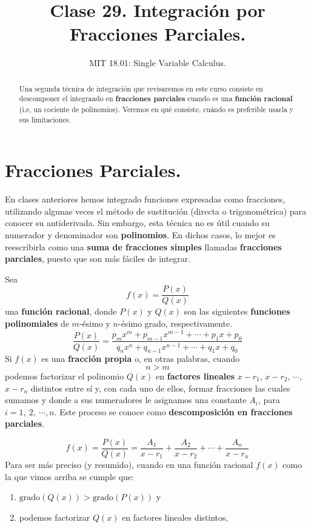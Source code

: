 \documentclass[12pt]{article}
\title{Clase 29. Integración por Fracciones Parciales.}
\author{MIT 18.01: Single Variable Calculus.}
\date{}
\begin{document}
\maketitle

\begin{abstract}
\noindent Una segunda técnica de integración que revisaremos en este curso consiste en descomponer el integrando en \textbf{fracciones parciales} cuando es una \textbf{función racional} (i.e, un cociente de polinomios). Veremos en qué consiste, cuándo es preferible usarla y sus limitaciones.
\end{abstract}


\section{Fracciones Parciales.}

En clases anteriores hemos integrado funciones expresadas como fracciones, utilizando algunas veces el método de sustitución (directa o trigonométrica) para conocer su antiderivada. Sin embargo, esta técnica no es útil cuando su numerador y denominador son \textbf{polinomios}. En dichos casos, lo mejor es reescribirla como una \textbf{suma de fracciones simples} llamadas \textbf{fracciones parciales}, puesto que son más fáciles de integrar.

Sea
\[
  f(x) = \frac{P(x)}{Q(x)}
\]
una \textbf{función racional}, donde $P(x)$ y $Q(x)$ son las siguientes \textbf{funciones polinomiales} de $m$-ésimo y $n$-ésimo grado, respectivamente.
\[
  \frac{P(x)}{Q(x)} = \frac{p_{m}x^{m} + p_{m - 1}x^{m - 1} + \cdots + p_{1}x + p_{0}}{q_{n}x^{n} + q_{n - 1}x^{n - 1} + \cdots + q_{1}x + q_{0}}
\]
Si $f(x)$ es una \textbf{fracción propia} o, en otras palabras, cuando
\[
  n > m
\]
podemos factorizar el polinomio $Q(x)$ en \textbf{factores lineales} $x - r_{1}$, $x - r_{2}$, $\cdots$, $x - r_{n}$ distintos entre sí y, con cada uno de ellos, formar fracciones las cuales sumamos y donde a sus numeradores le asignamos una constante $A_{i}$, para $i = 1, \ 2, \ \cdots, n$. Este proceso se conoce como \textbf{descomposición en fracciones parciales}.

\[
  f(x) = \frac{P(x)}{Q(x)} = \frac{A_{1}}{x - r_{1}} + \frac{A_{2}}{x - r_{2}} + \cdots + \frac{A_{n}}{x - r_{n}}
\]
Para ser más preciso (y resumido), cuando en una función racional $f(x)$ como la que vimos arriba se cumple que:

\begin{enumerate}
\item $\text{grado}(Q(x)) > \text{grado}(P(x))$ y
\item podemos factorizar $Q(x)$ en factores lineales distintos,
\end{enumerate}
\end{document}
